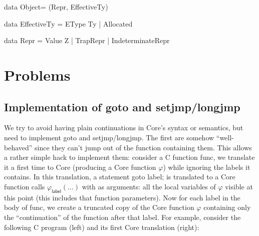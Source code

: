 \documentclass[12pt, a4paper]{article}
\newcommand{\syn}[1]{\textsf{#1}} %
\newcommand{\csyn}[1]{#1} %
\begin{document}
data Object= (Repr, EffectiveTy)

data EffectiveTy = EType Ty | Allocated

data Repr = Value Z | TrapRepr | IndeterminateRepr





\newpage



















\section{Problems}

\subsection{Implementation of \csyn{goto} and \csyn{setjmp}/\csyn{longjmp}}

We try to avoid having plain continuations in Core's syntax or semantics, but need to implement \csyn{goto} and \csyn{setjmp}/\csyn{longjmp}.
The first are somehow ``well-behaved'' since they can't jump out of the function containing them.
This allows a rather simple hack to implement them:
consider a C function \csyn{func}, we translate it a first time to Core (producing a Core function $\varphi$) while ignoring the labels it contains.
In this translation, a statement \csyn{goto label;} is translated to a Core function calls $\varphi_{\syn{label}}(\dots)$ with as arguments: all the local variables
of $\varphi$ visible at this point (this includes that function parameters).
Now for each label in the body of \csyn{func}, we create a truncated copy of the Core function $\varphi$ containing only the ``continuation'' of the
function after that label. For example, consider the following C program (left) and its first Core translation (right):
\end{document}
